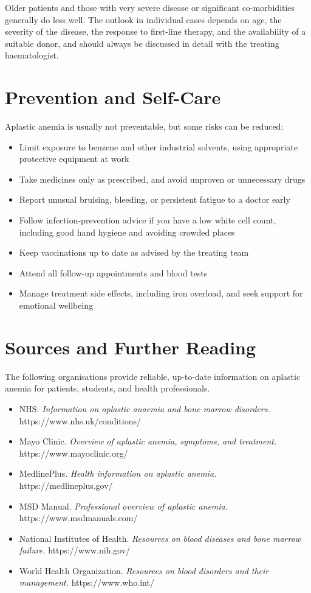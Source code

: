 Older patients and those with very severe disease or significant co-morbidities generally do less well. The outlook in individual cases depends on age, the severity of the disease, the response to first-line therapy, and the availability of a suitable donor, and should always be discussed in detail with the treating haematologist.

\section*{Prevention and Self-Care}
Aplastic anemia is usually not preventable, but some risks can be reduced:

\begin{itemize}
    \item Limit exposure to benzene and other industrial solvents, using appropriate protective equipment at work
    \item Take medicines only as prescribed, and avoid unproven or unnecessary drugs
    \item Report unusual bruising, bleeding, or persistent fatigue to a doctor early
    \item Follow infection-prevention advice if you have a low white cell count, including good hand hygiene and avoiding crowded places
    \item Keep vaccinations up to date as advised by the treating team
    \item Attend all follow-up appointments and blood tests
    \item Manage treatment side effects, including iron overload, and seek support for emotional wellbeing
\end{itemize}

\section*{Sources and Further Reading}
The following organisations provide reliable, up-to-date information on aplastic anemia for patients, students, and health professionals.

\begin{itemize}
    \item NHS. \textit{Information on aplastic anaemia and bone marrow disorders.} https://www.nhs.uk/conditions/
    \item Mayo Clinic. \textit{Overview of aplastic anemia, symptoms, and treatment.} https://www.mayoclinic.org/
    \item MedlinePlus. \textit{Health information on aplastic anemia.} https://medlineplus.gov/
    \item MSD Manual. \textit{Professional overview of aplastic anemia.} https://www.msdmanuals.com/
    \item National Institutes of Health. \textit{Resources on blood diseases and bone marrow failure.} https://www.nih.gov/
    \item World Health Organization. \textit{Resources on blood disorders and their management.} https://www.who.int/
\end{itemize}
